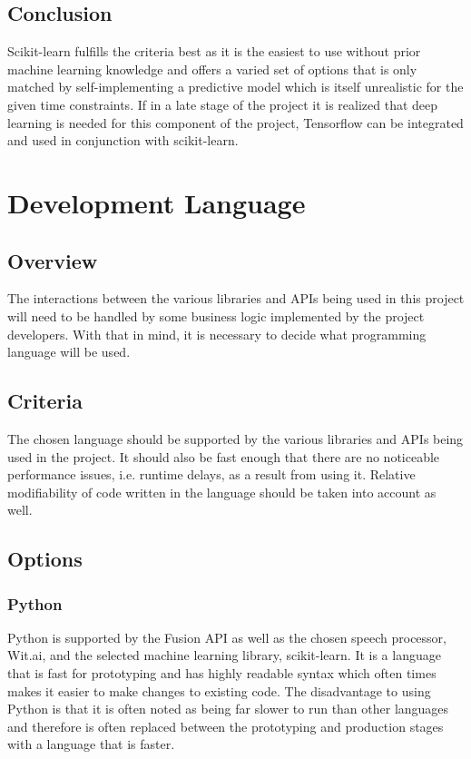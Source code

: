 \documentclass[onecolumn, draftclsnofoot,10pt, compsoc]{IEEEtran}
\begin{document}
    \subsection{Conclusion}
        Scikit-learn fulfills the criteria best as it is the easiest to use without prior machine learning knowledge and offers a varied set of options that is only matched by self-implementing a predictive model which is itself unrealistic for the given time constraints. 
        If in a late stage of the project it is realized that deep learning is needed for this component of the project, Tensorflow can be integrated and used in conjunction with scikit-learn.

\section{Development Language}
    \subsection{Overview}
        The interactions between the various libraries and APIs being used in this project will need to be handled by some business logic implemented by the project developers.
        With that in mind, it is necessary to decide what programming language will be used. 
    \subsection{Criteria}
        The chosen language should be supported by the various libraries and APIs being used in the project.
        It should also be fast enough that there are no noticeable performance issues, i.e. runtime delays, as a result from using it.
        Relative modifiability of code written in the language should be taken into account as well.
    \subsection{Options}
        \subsubsection{Python}
            Python is supported by the Fusion API as well as the chosen speech processor, Wit.ai, and the selected machine learning library, scikit-learn. 
            It is a language that is fast for prototyping and has highly readable syntax which often times makes it easier to make changes to existing code. 
            The disadvantage to using Python is that it is often noted as being far slower to run than other languages\cite{PyCppSpeedBenchmarks} and therefore is often replaced between the prototyping and production stages with a language that is faster.
\end{document}
